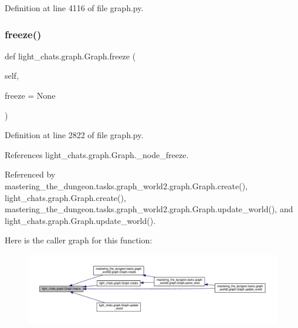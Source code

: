 Definition at line 4116 of file graph.\+py.

\mbox{\label{classlight__chats_1_1graph_1_1Graph_aa61c4fbc35d423277f0755cd8a16a43f}} 
\subsubsection{\texorpdfstring{freeze()}{freeze()}}
{\footnotesize\ttfamily def light\+\_\+chats.\+graph.\+Graph.\+freeze (\begin{DoxyParamCaption}\item[{}]{self,  }\item[{}]{freeze = {\ttfamily None} }\end{DoxyParamCaption})}



Definition at line 2822 of file graph.\+py.



References light\+\_\+chats.\+graph.\+Graph.\+\_\+node\+\_\+freeze.



Referenced by mastering\+\_\+the\+\_\+dungeon.\+tasks.\+graph\+\_\+world2.\+graph.\+Graph.\+create(), light\+\_\+chats.\+graph.\+Graph.\+create(), mastering\+\_\+the\+\_\+dungeon.\+tasks.\+graph\+\_\+world2.\+graph.\+Graph.\+update\+\_\+world(), and light\+\_\+chats.\+graph.\+Graph.\+update\+\_\+world().

Here is the caller graph for this function\+:
\nopagebreak
\begin{figure}[H]
\begin{center}
\leavevmode
\includegraphics[width=350pt]{classlight__chats_1_1graph_1_1Graph_aa61c4fbc35d423277f0755cd8a16a43f_icgraph}
\end{center}
\end{figure}
\mbox{\label{classlight__chats_1_1graph_1_1Graph_ac6f61220197d0eb8314fb98f6dd6f135}} 

